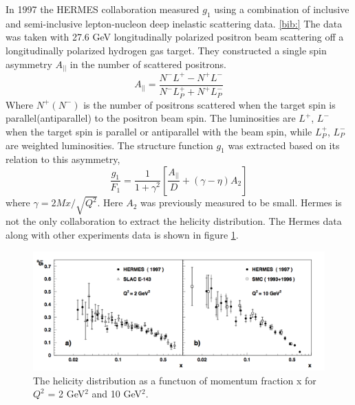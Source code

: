 \documentclass[abstract = on,listof=totoc, bibliography=totoc]{scrreprt}
\begin{document}
In 1997 the HERMES collaboration measured $g_1$ using a combination of inclusive and semi-inclusive lepton-nucleon deep inelastic scattering data. \ref{bib:} The data was taken with 27.6 GeV longitudinally polarized positron beam scattering off a longitudinally polarized hydrogen gas target. They constructed a single spin asymmetry $A_{||}$ in the number of scattered positrons. 
\begin{equation}
A_{||} = \frac{N^-L^+ - N^+L^-}{N^-L_P^+ + N^+L_P^-} 
\end{equation}
Where $N^+(N^-)$ is the number of positrons scattered when the target spin is parallel(antiparallel) to the positron beam spin. The luminosities are $L^+$, $L^-$ when the target spin is parallel or antiparallel with the beam spin, while $L^+_P$, $L^-_P$ are weighted luminosities. The structure function $g_1$ was extracted based on its relation to this asymmetry,
\begin{equation}
\frac{g_1}{F_1} = \frac{1}{1+\gamma^2}\left[\frac{A_{||}}{D} + (\gamma - \eta)A_2\right]
\end{equation}
where $\gamma = 2Mx/\sqrt{Q^2}$. Here $A_2$ was previously measured to be small\cite{hermesHel}\cite{strucFuncsg1g2}.
Hermes is not the only collaboration to extract the helicity distribution. The Hermes data along with other experiments data is shown in figure \ref{fig:helicityDist}. 
 \begin{figure}
\begin{center}
\includegraphics[width = 1\textwidth]{helicityDistFromHermes}
\caption[HERMES results for helicity distribution function]{The helicity distribution as a functuon of momentum fraction x for $Q^2$ = 2 GeV$^2$ and 10 GeV$^2$.}
\label{fig:helicityDist}
\end{center}
\end{figure}
\end{document}
